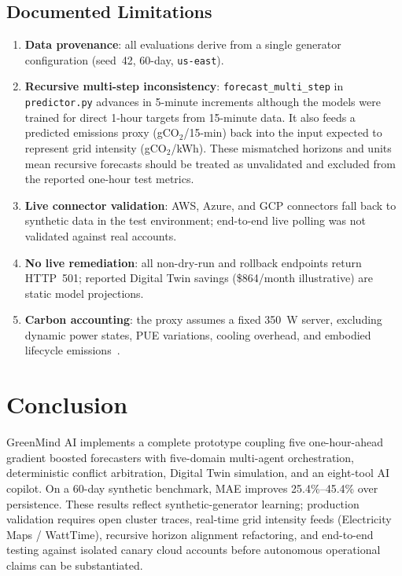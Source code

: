 \documentclass[conference]{IEEEtran}
\begin{document}
\subsection{Documented Limitations}
\begin{enumerate}
  \item \textbf{Data provenance}: all evaluations derive from a single
        generator configuration (seed~42, 60-day, \texttt{us-east}).
  \item \textbf{Recursive multi-step inconsistency}: \texttt{forecast\_multi\_step}
        in \texttt{predictor.py} advances in 5-minute increments although
        the models were trained for direct 1-hour targets from 15-minute data.
        It also feeds a predicted emissions proxy (gCO$_2$/15-min) back into
        the input expected to represent grid intensity (gCO$_2$/kWh). These
        mismatched horizons and units mean recursive forecasts should be
        treated as unvalidated and excluded from the reported one-hour test metrics.
  \item \textbf{Live connector validation}: AWS, Azure, and GCP connectors
        fall back to synthetic data in the test environment; end-to-end
        live polling was not validated against real accounts.
  \item \textbf{No live remediation}: all non-dry-run and rollback
        endpoints return HTTP~501; reported Digital Twin savings
        (\$864/month illustrative) are static model projections.
  \item \textbf{Carbon accounting}: the proxy assumes a fixed 350~W server,
        excluding dynamic power states, PUE variations, cooling overhead,
        and embodied lifecycle emissions~\cite{r5}.
\end{enumerate}

\section{Conclusion}
GreenMind AI implements a complete prototype coupling five one-hour-ahead
gradient boosted forecasters with five-domain multi-agent orchestration,
deterministic conflict arbitration, Digital Twin simulation, and an
eight-tool AI copilot. On a 60-day synthetic benchmark, MAE improves
25.4\%--45.4\% over persistence.  These results reflect synthetic-generator
learning; production validation requires open cluster traces, real-time
grid intensity feeds (Electricity Maps / WattTime), recursive horizon
alignment refactoring, and end-to-end testing against isolated canary cloud
accounts before autonomous operational claims can be substantiated.
\end{document}
